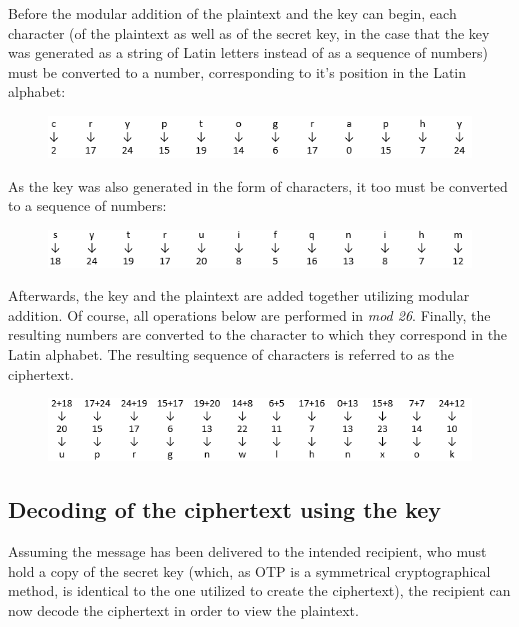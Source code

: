 \documentclass[12pt]{report}
\begin{document}
Before the modular addition of the plaintext and the key can begin, each character (of the plaintext as well as of the secret key, in the case that the key was generated as a string of Latin letters instead of as a sequence of numbers) must be converted to a number, corresponding to it's position in the Latin alphabet:

\begin{figure}[H]
\centering
\includegraphics[scale=1]{Table1.PNG}		
\end{figure}


As the key was also generated in the form of characters, it too must be converted to a sequence of numbers:

\begin{figure}[H]
\centering
\includegraphics[scale=1]{Table2.PNG}
\end{figure}

Afterwards, the key and the plaintext are added together utilizing modular addition. Of course, all operations below are performed in \textit{mod 26}. Finally, the resulting numbers are converted to the character to which they correspond in the Latin alphabet. The resulting sequence of characters is referred to as the ciphertext.

\begin{figure}[H]
\centering
\includegraphics[scale=1]{Table3.PNG}
\end{figure}

\subsection{Decoding of the ciphertext using the key}
Assuming the message has been delivered to the intended recipient, who must hold a copy of the secret key (which, as OTP is a symmetrical cryptographical method, is identical to the one utilized to create the ciphertext), the recipient can now decode the ciphertext in order to view the plaintext.
\end{document}
